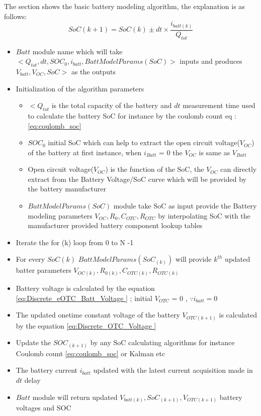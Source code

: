 The section shows the basic battery modeling algorithm, the explanation is as follows:
\begin{equation}\label{eq:coulomb_soc}
    SoC(k+1) =  SoC(k)  \pm dt\times \frac{i_{batt(k)}}{Q_{tot}}
\end{equation}
\begin{itemize}
    \item $Batt$ module name which will take  $<Q_{tot},dt,SOC_0,i_{batt},BattModelParams(SoC)>$ inputs and produces $V_{batt},V_{OC},SoC>$ as the outputs
    \item Initialization of the algorithm parameters
    \begin{itemize}
        \item $<Q_{tot}$ is the total capacity of the battery and $dt$ measurement time used to calculate the battery SoC for instance by the coulomb count eq :\ref{eq:coulomb_soc}
        \item $SOC_0$ initial SoC which can help to extract the open circuit voltage($V_{OC}$) of the battery at first instance, when $i_{Batt}$ = 0 the $V_{OC}$ is same as $V_{Batt}$
        \item Open circuit voltage($V_{OC}$) is the function of the SoC, the $V_{OC}$ can directly extract from the Battery Voltage/SoC curve which will be provided by the battery manufacturer 
        \item $BattModelParams(SoC)$ module take SoC as input provide the Battery modeling parameters $V_{OC},R_0,C_{OTC},R_{OTC}$ by interpolating SoC with the manufacturer provided battery component lookup tables 
    \end{itemize}
    \item Iterate the for (k) loop  from 0 to N -1
    \item For every $SoC(k)$ $BattModelParams(SoC_{(k)})$ will provide $k^{th}$ updated batter parameters $V_{OC(k)},R_{0(k)},C_{OTC(k)},R_{OTC(k)}$
    \item Battery voltage is calculated by the equation \ref{eq:Discrete_eOTC_Batt_Voltage } ; initial $V_{OTC}$ = 0 , $\because i_{batt} = 0$ 
    \item The updated onetime constant voltage of the battery $V_{OTC(k+1)}$ is calculated by the equation \ref{eq:Discrete_OTC_Voltage }
    \item Update the $SOC_(k+1)$ by any SoC calculating algorithms for instance Coulomb count \ref{eq:coulomb_soc} or Kalman etc
    \item The battery current $i_{batt}$ updated with the latest current acquisition made in $dt$ delay 
    \item $Batt$ module will return updated {$V_{batt(k)},SoC_{(k+1)},V_{OTC(k+1)} $} battery voltages and SOC
\end{itemize}

